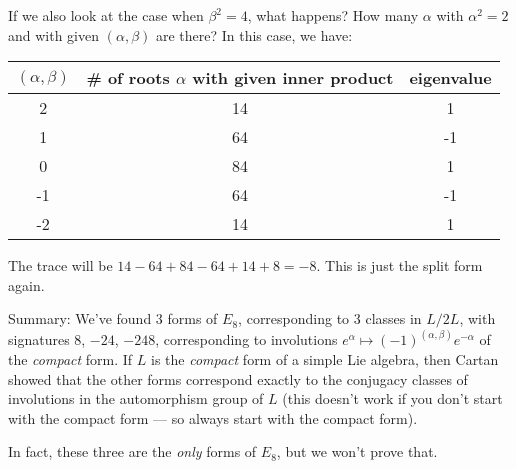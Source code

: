  If we also look at the case when $\beta^2=4$, what happens? How many $\alpha$ with
 $\alpha^2=2$ and with given $(\alpha,\beta)$ are there?  In this case,
 we have:
 \begin{center}
 \begin{tabular}{|c|c|c|}
 \hline
 $(\alpha,\beta)$ & \# of roots $\alpha$ with given inner product & eigenvalue\\
 \hline
 2                & 14                                       & 1  \\
 1                & 64                                       & -1 \\
 0                & 84                                       & 1  \\
 -1               & 64                                       & -1 \\
 -2               & 14                                       & 1  \\
 \hline
 \end{tabular}
 \end{center}
 The trace will be $14-64+84-64+14+8=-8$. This is just the split form again.

 Summary: We've found $3$ forms of $E_8$, corresponding to 3 classes in $L/2L$, with
 signatures 8, $-24$, $-248$, corresponding to involutions $e^\alpha\mapsto
 (-1)^{(\alpha,\beta)}e^{-\alpha}$ of the \emph{compact} form. If $L$ is the
 \emph{compact} form of a simple Lie algebra, then Cartan showed that
 the other forms correspond exactly to the conjugacy classes of involutions in the
 automorphism group of $L$ (this doesn't work if you don't start with the compact form
 --- so always start with the compact form).

 In fact, these three are the \emph{only} forms of $E_8$, but we won't prove that.

